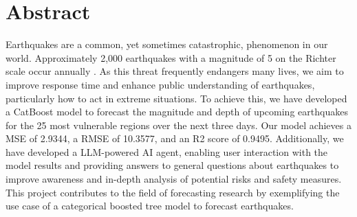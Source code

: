 \chapter*{Abstract}

Earthquakes are a common, yet sometimes catastrophic, phenomenon in our world.
Approximately 2,000 earthquakes with a magnitude of 5 on the Richter scale
occur annually \parencite{welt_erdbeben}. As this threat frequently endangers
many lives, we aim to improve response time and enhance public understanding
of earthquakes, particularly how to act in extreme situations. To achieve this,
we have developed a CatBoost model to forecast the magnitude and depth of
upcoming earthquakes for the 25 most vulnerable regions over the next three days.
Our model achieves a \ac{MSE} of 2.9344, a \ac{RMSE} of 10.3577, and an R2 score
of 0.9495. Additionally, we have developed a \ac{LLM}-powered AI agent,
enabling user interaction with the model results and
providing answers to general questions about earthquakes to improve awareness and
in-depth analysis of potential risks and safety measures. This project contributes
to the field of forecasting research by exemplifying the use case of a categorical
boosted tree model to forecast earthquakes.

